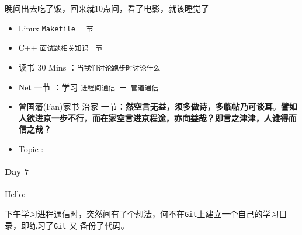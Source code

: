 \documentclass[UTF8,a4paper,8pt]{ctexart}
\begin{document}
	 	 晚间出去吃了饭，回来就10点间，看了电影，就该睡觉了
		 	 \begin{itemize}[itemindent = 1em]
		 	 	\renewcommand\labelitemi{\makebox[0pt][l]{$\square$}\hspace{1em}} 
		 	 	\renewcommand\labelitemi{\makebox[0pt][l]{$\square$}\raisebox{.15ex}{\hspace{0.1em}$\checkmark$}}	 	
		 	 	\item   Linux \verb|Makefile 一节|
		 	 	\item   C++   \verb|面试题相关知识一节|
		 	 	
		 	 	\item   读书  30 Mins	：\verb|当我们讨论跑步时讨论什么|
		 	 	\item   Net 一节 ：学习 \verb|进程间通信 一 管道通信|	
		 	 	\renewcommand\labelitemi{\makebox[0pt][l]{$\square$}\hspace{1em}} 
		 	 	
		 	 	
		 	 	\renewcommand\labelitemi{\makebox[0pt][l]{$\square$}\raisebox{.15ex}{\hspace{0.1em}$\checkmark$}}
		 	 	\item   曾国藩(Fan)家书 治家 一节：\textbf{然空言无益，须多做诗，多临帖乃可谈耳}。\textbf{譬如人欲进京一步不行，而在家空言进京程途，亦向益哉？即言之津津，人谁得而信之哉？}
		 	 	\item   Topic :
		 	 \end{itemize}
 	 \paragraph{Day 7       \quad     }
	 	 Hello:
	 	 
	 	 下午学习进程通信时，突然间有了个想法，何不在\verb|Git|上建立一个自己的学习目录，即练习了\verb|Git| 又 备份了代码。
	 	 
\end{document}
